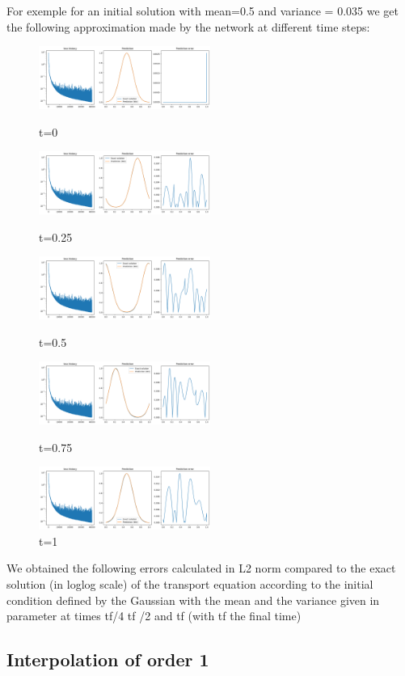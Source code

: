 \documentclass{article}
\begin{document}
For exemple for an initial solution with mean=0.5 and variance = 0.035 we get the following approximation made by the network at different time steps:\\
\newpage
\begin{figure}[!h]
    \centering
    \includegraphics[width=0.5\textwidth]{images/r1.png}
    \caption{t=0}
    \includegraphics[width=0.5\textwidth]{images/r2.png}
    \caption{t=0.25}
    \includegraphics[width=0.5\textwidth]{images/r3.png}
    \caption{t=0.5}
    \includegraphics[width=0.5\textwidth]{images/r4.png}
    \caption{t=0.75}
    \includegraphics[width=0.5\textwidth]{images/r5.png}
    \caption{t=1}
\end{figure}

We obtained the following errors calculated in L2 norm compared to the exact solution (in loglog scale) of the transport equation according to the initial condition defined by the Gaussian with the mean and the variance given in parameter at times tf/4 tf /2 and tf (with tf the final time)\\
\subsection{Interpolation of order 1}
\end{document}
